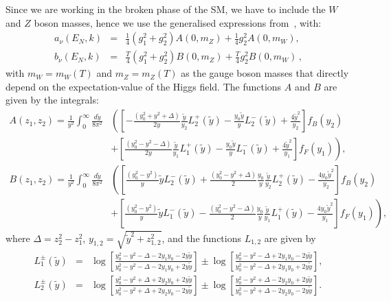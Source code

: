 \documentclass[12pt, a4paper]{article}
\begin{document}
Since we are working in the broken phase of the SM, we have to include the $W$ and $Z$ boson masses, hence we use the generalised expressions from~\cite{Quimbay:1995jn}, with:
\begin{eqnarray}
 a_\nu(E_N,k)&=&\frac14(g_1^2 + g_2^2) A(0,m_Z)
 + \frac14 g_2^2 A(0,m_W)
 ,\\
 b_\nu(E_N,k)&=&\frac{T}{4}(g_1^2 + g_2^2) B(0,m_Z)
 + \frac{T}{4} g_2^2 B(0,m_W)\,,
\end{eqnarray}
with $m_W = m_W(T)$ and $m_Z = m_Z(T)$ as the gauge boson masses that directly depend on the expectation-value of the Higgs field.
The functions $A$ and $B$ are given by the integrals:
 \begin{align}
 A(z_1, z_2)=\frac{1}{y^2}\int^\infty_0\frac{d\tilde y}{8\pi^2}
 &\left(\left[-\frac{(y_0^2+y^2+\Delta)}{2y}\frac{\tilde y}
 {y_2}L_2^{+}(\tilde y)-\frac{y_0 \tilde y}{y}L_2^{-}(\tilde y)+\frac{4{\tilde y}^2}
 {y_2}\right]f_B(y_2)\right.\nonumber\\
 &+\left.\left[\frac{(y_0^2-y^2-\Delta)}{2y}\frac{\tilde y}
 {y_1}L_1^{+}(\tilde y)-\frac{y_0 \tilde y}{y}L_1^{-}(\tilde y)+\frac{4{\tilde y}^2}
 {y_1}\right]f_F(y_1)\right),\\
 B(z_1,z_2)=\frac{1}{y^2}\int^\infty_0\frac{d\tilde y}{8\pi^2}
 &\left(\left[\frac{(y_0^2-y^2)}{y}{\tilde y}L_2^{-}(\tilde y)+
 \frac{(y_0^2-y^2+\Delta)}{2}\frac{y_0}{y}\frac{\tilde y}
 {y_2}L_2^{+}(\tilde y)-\frac{4y_0 {\tilde y}^2}{y_2}\right]
 f_B(y_2)\right.\nonumber\\
 &+\left.\left[\frac{(y_0^2-y^2)}{y}{\tilde y}L_1^{-}(\tilde y)-
 \frac{(y_0^2-y^2-\Delta)}{2}\frac{y_0}{y}\frac{\tilde y}
 {y_1}L_1^{+}(\tilde y)-\frac{4y_0 {\tilde y}^2}
 {y_1}\right]f_F(y_1)\right),
 \end{align} 
where $\Delta = z_2^2 - z_1^2$, $y_{1,2} = \sqrt{{\tilde y}^2 + z_{1,2}^2}$,
and the functions $L_{1,2}$ are given by
 \begin{eqnarray}
   L_1^{\pm}(\tilde y) &=&
   \log\left[
   \frac{y_0^2-y^2- \Delta-2y_1y_0-2y\tilde y}
 {y_0^2-y^2-\Delta-2y_1y_0+2y\tilde y}\right]\pm
 \log\left[
   \frac{y_0^2-y^2-\Delta+2y_1y_0-2y\tilde y}
 {y_0^2-y^2-\Delta+2y_1y_0+2y\tilde y}\right],\\
 L_2^{\pm}(\tilde y) &=&\log\left[\frac{y_0^2-y^2+
 \Delta+2y_2y_0+2y\tilde y}
 {y_0^2-y^2+\Delta+2y_2y_0-2y\tilde y}\right]\pm
 \log\left[\frac{y_0^2-y^2+\Delta-2y_2y_0+2y\tilde y}
 {y_0^2-y^2+\Delta-2y_2y_0-2y\tilde y}
   \right].
 \end{eqnarray}
\end{document}
